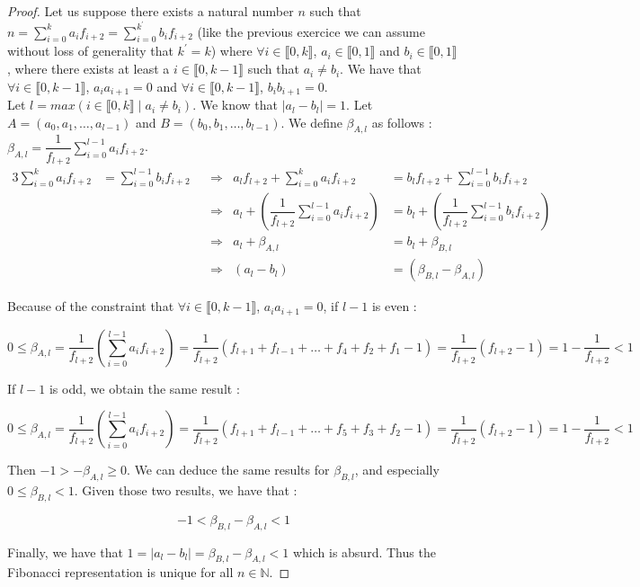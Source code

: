 \documentclass{article}
\begin{document}
\begin{proof}
  Let us suppose there exists a natural number $n$ such that $n = \displaystyle\sum_{i=0}^k a_if_{i+2} = \displaystyle\sum_{i=0}^{k^\prime} b_if_{i+2}$ (like the previous exercice we can assume without loss of generality that $k^\prime = k$) where $\forall i \in \llbracket 0, k\rrbracket$, $a_i \in \llbracket 0, 1\rrbracket$ and $b_i \in \llbracket 0, 1\rrbracket$, where there exists at least a $i \in \llbracket 0, k-1\rrbracket$ such that $a_i \ne b_i$. We have that $\forall i \in \llbracket 0, k-1\rrbracket$, $a_ia_{i+1} = 0$ and $\forall i \in \llbracket 0, k-1\rrbracket$, $b_ib_{i+1} = 0$. \\

  Let $l=max(i \in \llbracket 0, k\rrbracket \mid a_i \ne b_i)$. We know that $|a_l-b_l| = 1$. Let $A=(a_0, a_1, \dots , a_{l-1})$ and $B=(b_0, b_1, \dots , b_{l-1})$. We define $\beta_{A, l}$ as follows : $\beta_{A, l} = \dfrac{1}{f_{l+2}}\displaystyle\sum_{i=0}^{l-1} a_if_{i+2}$.\\

  \begin{alignat*}{3}
    \displaystyle\sum_{i=0}^k a_if_{i+2} &= \displaystyle\sum_{i=0}^{l-1} b_if_{i+2} & &\Rightarrow {} & a_lf_{l+2} + \displaystyle\sum_{i=0}^k a_if_{i+2} &= b_lf_{l+2} + \displaystyle\sum_{i=0}^{l-1} b_if_{i+2} \\
    & & &\Rightarrow  & a_l + (\dfrac{1}{f_{l+2}}\displaystyle\sum_{i=0}^{l-1} a_if_{i+2}) &= b_l + (\dfrac{1}{f_{l+2}}\displaystyle\sum_{i=0}^{l-1} b_if_{i+2}) \\
    & & &\Rightarrow  & a_l + \beta_{A, l} &= b_l + \beta_{B, l} \\
    & & &\Rightarrow  & (a_l-b_l) &= (\beta_{B, l}-\beta_{A, l})
  \end{alignat*}

 Because of the constraint that $\forall i \in \llbracket 0, k-1\rrbracket$, $a_ia_{i+1} = 0$, if $l-1$ is even :

 $$0 \leq \beta_{A, l} = \dfrac{1}{f_{l+2}}(\displaystyle\sum_{i=0}^{l-1} a_if_{i+2}) = \dfrac{1}{f_{l+2}}(f_{l+1} + f_{l-1} + \dots + f_4 + f_2 + f_1 -1) = \dfrac{1}{f_{l+2}}(f_{l+2} -1) = 1-\dfrac{1}{f_{l+2}} < 1$$

 If $l-1$ is odd, we obtain the same result :

 $$0 \leq \beta_{A, l} = \dfrac{1}{f_{l+2}}(\displaystyle\sum_{i=0}^{l-1} a_if_{i+2}) = \dfrac{1}{f_{l+2}}(f_{l+1} + f_{l-1} + \dots + f_5 + f_3 + f_2 -1) = \dfrac{1}{f_{l+2}}(f_{l+2} -1) = 1-\dfrac{1}{f_{l+2}} < 1$$

 Then $-1 > -\beta_{A, l} \geq 0$. We can deduce the same results for $\beta_{B, l}$, and especially $0 \leq \beta_{B, l} < 1$. Given those two results, we have that :

\begin{equation*}
  -1 < \beta_{B, l}-\beta_{A, l} < 1
\end{equation*}

Finally, we have that $1 = |a_l-b_l| = \beta_{B, l}-\beta_{A, l} < 1$ which is absurd. Thus the Fibonacci representation is unique for all $n \in \mathbb{N}$.

\end{proof}

\appendix


\end{document}
